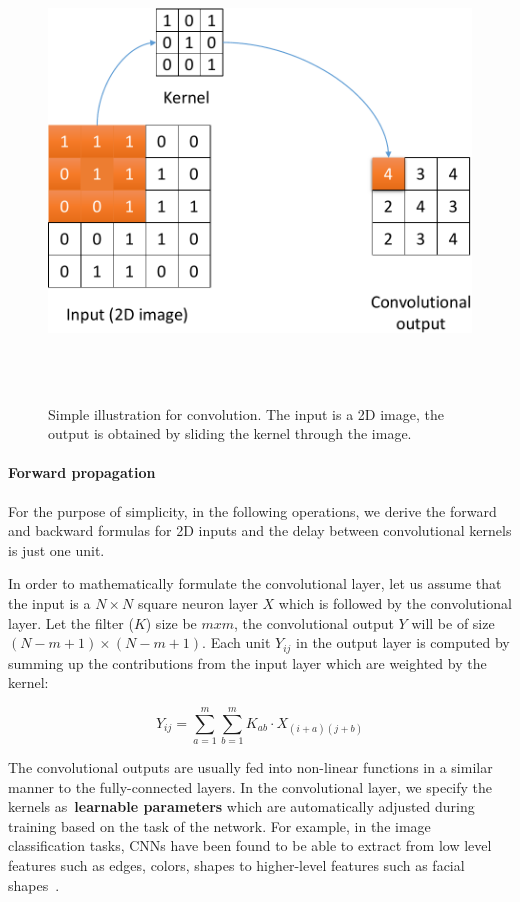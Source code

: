 ~ \begin{figure}
	~ \centering
	~ \includegraphics[width=\columnwidth/2]{figures/conv_ops.pdf}
	~ \caption{Simple illustration for convolution. The input is a 2D image, the output is obtained by sliding the kernel through the image.}  
	~ \label{fig:conv_ops}
	~ \end{figure}


\paragraph{Forward propagation} For the purpose of simplicity, in the following operations, we derive the forward and backward formulas for 2D inputs and the delay between convolutional kernels is just one unit. 

In order to mathematically formulate the convolutional layer, let us assume that the input is a $N \times N$ square neuron layer $X$ which is followed by the convolutional layer. Let the filter ($K$) size be $m x m$, the convolutional output $Y$ will be of size $(N - m + 1) \times (N - m + 1)$. Each unit $Y_{ij}$ in the output layer is computed by summing up the contributions from the input layer which are weighted by the kernel:

\begin{equation}
Y_{ij} = \sum_{a=1}^{m} \sum_{b=1}^{m} K_{ab} \cdot X_{(i+a)(j+b)}
\label{eq:convolution}
\end{equation}


The convolutional outputs are usually fed into non-linear functions in a similar manner to the fully-connected layers. In the convolutional layer, we specify the kernels as~\textbf{learnable parameters} which are automatically adjusted during training based on the task of the network.  For example, in the image classification tasks, CNNs have been found to be able to extract from low level features such as edges, colors, shapes to higher-level features such as facial shapes~\cite{krizhevsky2012imagenet}. 

